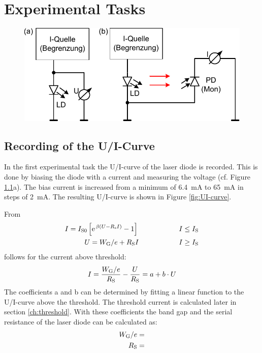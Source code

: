  \chapter{Experimental Tasks}

\begin{figure}[ht]
\centering
\includegraphics[width=.6\columnwidth]{Grafiken/measurement1.pdf}%
\caption{}%
\label{fig:measurement1}%
\end{figure}


\section{Recording of the U/I-Curve}



 In the first experimental task the U/I-curve of the laser diode is recorded. This is done by biasing the diode with a current and measuring the voltage (cf. Figure \ref{fig:measurement1}a). The bias current is increased from a minimum of 6.4~mA to 65~mA in steps of 2~mA. The resulting U/I-curve is shown in Figure \ref{fig:UI-curve}.

From
\begin{equation}
 \begin{split}
I = I\i{S0}\left[\e^{\beta\left(U-R\i{s}I\right)}-1\right] \hspace{2cm} I\leq I\i{S}\\
U = W\i{G}/e +R\i{S}I \hspace{2cm} I\geq I\i{S}\\
 \end{split}
\end{equation}
follows for the current above threshold:
\begin{equation}
 I = \frac{W_{\mathrm{G}}/e}{R_{\mathrm{S}}}-\frac{U}{R_{\mathrm{S}}} = a + b\cdot U
\end{equation}
The coefficients a and b can be determined by fitting a linear function to the U/I-curve above the threshold. The threshold current is calculated later in section \ref{ch:threshold}.  With these coefficients the band gap and the serial resistance of the laser diode can be calculated as:
\begin{equation}
\begin{split}
 W_{\mathrm{G}}/e=\\
 R_{\mathrm{S}} = 
\end{split}
\end{equation}


